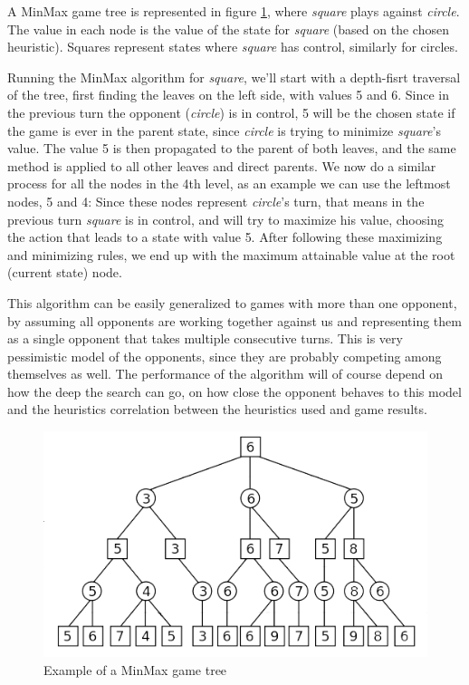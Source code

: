 A MinMax game tree is represented in figure \ref{fig:min_max}, where \textit{square} plays against \textit{circle}. The value in each node is the value of the state for \textit{square} (based on the chosen heuristic). Squares represent states where \textit{square} has control, similarly for circles.

Running the MinMax algorithm for \textit{square}, we'll start with a depth-fisrt traversal of the tree, first finding the leaves on the left side, with values 5 and 6. Since in the previous turn the opponent (\textit{circle}) is in control, 5 will be the chosen state if the game is ever in the parent state, since \textit{circle} is trying to minimize \textit{square}'s value. 
The value 5 is then propagated to the parent of both leaves, and the same method is applied to all other leaves and direct parents. We now do a similar process for all the nodes in the 4th level, as an example we can use the leftmost nodes, 5 and 4: Since these nodes represent \textit{circle}'s turn, that means in the previous turn \textit{square} is in control, and will try to maximize his value, choosing the action that leads to a state with value 5. After following these maximizing and minimizing rules, we end up with the maximum attainable value at the root (current state) node.

This algorithm can be easily generalized to games with more than one opponent, by assuming all opponents are working together against us and representing them as a single opponent that takes multiple consecutive turns. This is very pessimistic model of the opponents, since they are probably competing among themselves as well. The performance of the algorithm will of course depend on how the deep the search can go, on how close the opponent behaves to this model and the heuristics correlation between the heuristics used and game results.


\begin{figure}[h]
	\centering
    \includegraphics[scale=0.8]{images/min_max.png}
    \caption{Example of a MinMax game tree}
    \label{fig:min_max}
\end{figure}

